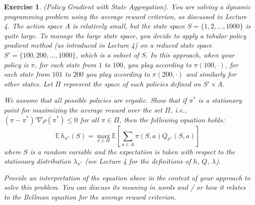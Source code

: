 \documentclass[letter,11pt]{article}
\newtheorem{exercise}{Exercise}[section]
\begin{document}
\begin{exercise} (Policy Gradient with State Aggregation).
     You are solving a dynamic programming problem using the average reward criterion, as discussed in Lecture 4. The action space $A$ is relatively small, but the state space $S = \{1, 2, \ldots, 1000\}$ is quite large. To manage the large state space, you decide to apply a tabular policy gradient method (as introduced in Lecture 4) on a reduced state space $S' = \{100, 200, \ldots, 1000\}$, which is a subset of $S$. In this approach, when your policy is $\pi$, for each state from $1$ to $100$, you play according to $\pi(100, \cdot)$, for each state from $101$ to $200$ you play according to $\pi(200, \cdot)$ and similarly for other states. Let $\Pi$ represent the space of such policies defined on $S' \times A$.
        
        We assume that all possible policies are ergodic.
        Show that if $\pi^{*}$ is a stationary point for maximizing the average reward over the set $\Pi$, i.e., $ (\pi-\pi^{*})' \nabla \rho (\pi^{*}) \leq 0$ for all $\pi \in \Pi$, then the following equation holds:
        \[
        \mathbb{E} \, h_{\pi^{*}}(S) = \max_{\pi \in \Pi} \mathbb{E} \left[ \sum_{a \in A} \pi(S,a) Q_{\pi^{*}}(S,a) \right]
        \]
        where $S$ is a random variable and the expectation is taken with respect to the stationary distribution $\lambda_{\pi^{*}}$ (see Lecture 4 for the definitions of $h$, $Q$, $\lambda$).

        Provide an interpretation of the equation above in the context of your approach to solve this problem. You can discuss its meaning in words and / or how it relates to the Bellman equation for the average reward criterion.


\end{exercise}
\end{document}
